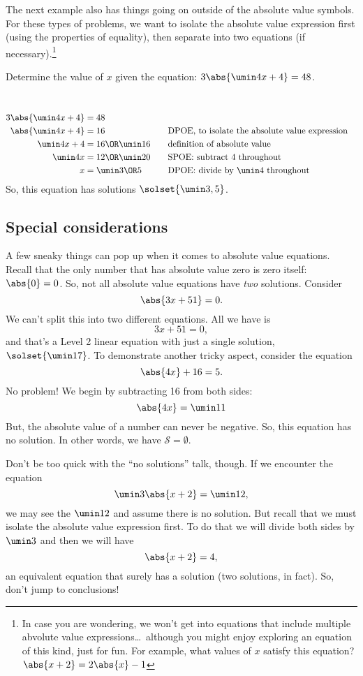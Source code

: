 The next example also has things going on outside of the absolute value symbols. For these types of problems, we want to isolate the absolute value expression first (using the properties of equality), then separate into two equations (if necessary).\footnote{In case you are wondering, we won't get into equations that include multiple abvolute value expressions\ldots\ although you might enjoy exploring an equation of this kind, just for fun. For example, what values of $x$ satisfy this equation? $\abs{x+2}=2\abs{x}-1$}

\begin{boxedex}
Determine the value of $x$ given the equation: $3\abs{\umin4x+4} = 48$.

\exsoln\ 
\[\begin{aligned}
3\abs{\umin4x+4} &= 48\\
\abs{\umin4x+4} &= 16
&&\text{\quad DPOE, to isolate the absolute value expression}\\
\umin4x+4 &= 16 \OR \umin16
&&\text{\quad definition of absolute value}\\
\umin4x &= 12 \OR \umin20
&&\text{\quad SPOE: subtract 4 throughout}\\
x &= \umin3 \OR 5
&&\text{\quad DPOE: divide by $\umin4$ throughout}
\end{aligned}\]
So, this equation has solutions $\solset{\umin3, 5}$.
\end{boxedex}

\subsection{Special considerations}

A few sneaky things can pop up when it comes to absolute value equations. Recall that the only number that has absolute value zero is zero itself: $\abs{0} = 0$. So, not all absolute value equations have \textit{two} solutions. Consider
\[\abs{3x + 51} = 0.\]
We can't split this into two different equations. All we have is
\[3x + 51 = 0,\]
and that's a Level 2 linear equation with just a single solution, $\solset{\umin17}$. To demonstrate another tricky aspect, consider the equation \[\abs{4x} + 16 = 5.\]
No problem! We begin by subtracting 16 from both sides:
\[\abs{4x} = \umin11\]
But, the absolute value of a number can never be negative. So, this equation has no solution. In other words, we have $\mathcal{S} = \emptyset$.

Don't be too quick with the ``no solutions'' talk, though. If we encounter the equation \[\umin3\abs{x + 2} = \umin12,\] we may see the $\umin12$ and assume there is no solution. But recall that we must isolate the absolute value expression first. To do that we will divide both sides by $\umin3$ and then we will have \[\abs{x+2} = 4,\] an equivalent equation that surely has a solution (two solutions, in fact). So, don't jump to conclusions!

